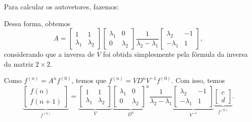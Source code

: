 Para calcular os autovetores, fazemos:
\begin{calcproof}[.]
\end{calcproof}

Dessa forma, obtemos
\[
  A
  =
  \begin{bmatrix}
    1 & 1 \\
    \lambda_1 & \lambda_2
  \end{bmatrix}
  \begin{bmatrix}
    \lambda_1 & 0 \\
    0 & \lambda_2
  \end{bmatrix}
  \dfrac{1}{\lambda_2 - \lambda_1}
  \begin{bmatrix}
    \lambda_2 & -1 \\
    - \lambda_1 & 1
  \end{bmatrix},
\]
considerando que a inversa de $V$ foi obtida simplesmente pela fórmula da inversa da matriz $2 \times 2$.

Como $f^{(n)} = A^{n} f^{(0)}$, temos que $f^{(n)} = V D^{n} V^{-1} f^{(0)}$. Com isso, temos
\[
  \underbrace{\begin{bmatrix}
    f(n) \\
    f(n+1)
  \end{bmatrix}}_{f^{(n)}}
  =
  \underbrace{\begin{bmatrix}
    1 & 1 \\
    \lambda_1 & \lambda_2
  \end{bmatrix}}_{V}
  \underbrace{\begin{bmatrix}
    \lambda_1 & 0 \\
    0 & \lambda_2
  \end{bmatrix}^n}_{D^{n}}
  \dfrac{1}{\lambda_2 - \lambda_1}
  \underbrace{\begin{bmatrix}
    \lambda_2 & -1 \\
    - \lambda_1 & 1
  \end{bmatrix}}_{V^{-1}}
  \underbrace{\begin{bmatrix}
    c \\
    d
  \end{bmatrix}}_{f^{(0)}}.
\]

